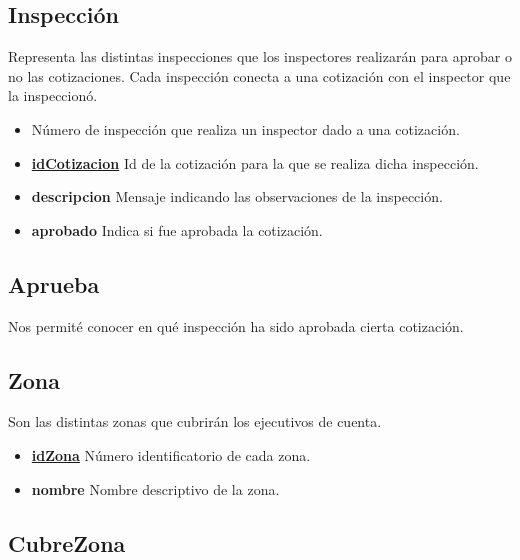 \documentclass[a4paper,11pt]{article}
\begin{document}
\subsection{Inspección}

Representa las distintas inspecciones que los inspectores realizarán para aprobar o no las cotizaciones.
Cada inspección conecta a una cotización con el inspector que la inspeccionó.

\begin{itemize}
   
  \item \textbf{} Número de inspección que realiza un inspector dado a una cotización.
  
  \item \textbf{\uline{idCotizacion}} Id de la cotización para la que se realiza dicha inspección.
    
  \item \textbf{descripcion} Mensaje indicando las observaciones de la inspección.

  \item \textbf{aprobado} Indica si fue aprobada la cotización.
    
\end{itemize}

\subsection{Aprueba}

Nos permité conocer en qué inspección ha sido aprobada cierta cotización.

\subsection{Zona}

Son las distintas zonas que cubrirán los ejecutivos de cuenta.

\begin{itemize}
   
  \item \textbf{\uline{idZona}} Número identificatorio de cada zona.
  
  \item \textbf{nombre} Nombre descriptivo de la zona.
  
\end{itemize}

\subsection{CubreZona}
\end{document}
